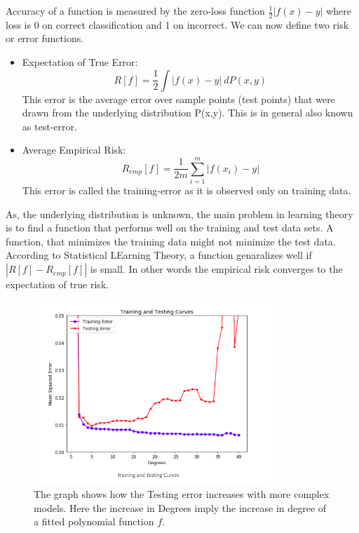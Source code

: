 \documentclass{article}
\begin{document}
Accuracy of a function is measured by the zero-loss function $\frac{1}{2} |f(x) - y|$ where loss is 0 on correct classification and 1 on incorrect. We can now define two risk or error functions.
\begin{itemize}
    \item Expectation of True Error: 
    \begin{equation}
        R[f] = \frac{1}{2} \int{|f(x) - y|} \ dP(x,y) \nonumber
    \end{equation}
    This error is the average error over sample points (test points) that were drawn from the underlying distribution P(x,y). This is in general also known as test-error.
    \item Average Empirical Risk: 
    \begin{equation}
        R_{emp}[f] = \frac{1}{2m} \sum_{i=1}^{m}{|f(x_i) - y|}
    \end{equation}
    This error is called the training-error as it is observed only on training data. 
\end{itemize}
As, the underlying distribution is unknown, the main problem in learning theory is to find a function that performs well on the training and test data sets. A function, that minimizes the training data might not minimize the test data. According to Statistical LEarning Theory, a function genaralizes well if $|R[f] - R_{emp}[f]|$ is small. In other words the empirical risk converges to the expectation of true risk. \cite{intro_stat}

\begin{figure}
  \centering
  \includegraphics[width=0.8\textwidth]{test-train_error.png}
  \caption{The graph shows how the Testing error increases with more complex models. Here the increase in Degrees imply the increase in degree of a fitted polynomial function $f$.}
  \label{fig:error_fig}
\end{figure}
\end{document}
